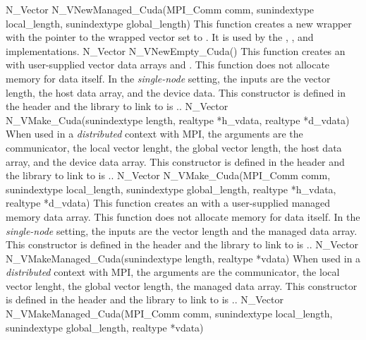 {
  N\_Vector N\_VNewManaged\_Cuda(MPI\_Comm comm, sunindextype local\_length,
  sunindextype global\_length)
}
{
  This function creates a new {\nvector} wrapper with the pointer to
  the wrapped {\cuda} vector set to . It is used by the
  , , and 
  implementations.
}
{
  N\_Vector N\_VNewEmpty\_Cuda()
}
{
  This function creates an {\nveccuda} with user-supplied vector data arrays
   and . This function does not allocate memory for
  data itself.
}
{
  In the \textit{single-node} setting, the inputs are the vector length, the
  host data array, and the device data. This constructor is defined in the
  header  and the library to link to is
  ..
}
{
  N\_Vector N\_VMake\_Cuda(sunindextype length, realtype *h\_vdata,
  realtype *d\_vdata)
}
{
  When used in a \textit{distributed} context with MPI, the arguments are the
  {\mpi} communicator, the local vector lenght, the global vector length, the
  host data array, and the device data array. This constructor is defined in the
  header  and the library to link to is
  ..
}
{
  N\_Vector N\_VMake\_Cuda(MPI\_Comm comm, sunindextype local\_length,
  sunindextype global\_length, realtype *h\_vdata,
  realtype *d\_vdata)
}
{
  This function creates an {\nveccuda} with a user-supplied managed memory data
  array. This function does not allocate memory for data itself.
}
{
  In the \textit{single-node} setting, the inputs are the vector length and the
  managed data array. This constructor is defined in the header
   and the library to link to is
  ..
}
{
  N\_Vector N\_VMakeManaged\_Cuda(sunindextype length, realtype *vdata)
}
{
  When used in a \textit{distributed} context with MPI, the arguments are the
  {\mpi} communicator, the local vector lenght, the global vector length, the
  managed data array. This constructor is defined in the header
   and the library to link to is 
  ..
}
{
  N\_Vector N\_VMakeManaged\_Cuda(MPI\_Comm comm, sunindextype local\_length,
  sunindextype global\_length, realtype *vdata)
}


